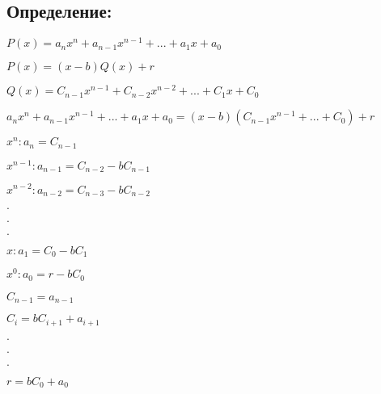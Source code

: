 \documentclass[12pt]{article}
\begin{document}
\subsection{Определение:}
$P(x) = a_{n}x^{n} + a_{n-1}x^{n-1} + ... + a_{1}x + a_{0}$\par
$P(x)=(x-b)Q(x) + r$\par
$Q(x) = C_{n-1}x^{n-1} + C_{n-2}x^{n-2} + ... + C_{1}x + C_{0}$\par
$a_{n}x^{n} + a_{n-1}x^{n-1} + ... + a_{1}x + a_{0} = (x-b)(C_{n-1}x^{n-1} + ... + C_{0}) + r$\par
$x^{n}: a_{n} = C_{n-1}$\par
$x^{n-1}: a_{n-1} = C_{n-2} - bC_{n-1}$\par
$x^{n-2}: a_{n-2} = C_{n-3} - bC_{n-2}$\par
$.$\par
$.$\par
$.$\par
$x: a_{1} = C_{0} - bC_{1}$\par
$x^{0}: a_{0} = r - bC_{0}$\par
$C_{n-1} = a_{n-1}$\par
$C_{i} = bC_{i+1} + a_{i+1}$\par
$.$\par
$.$\par
$.$\par
$r = bC_{0} + a_{0}$\par
\end{document}
